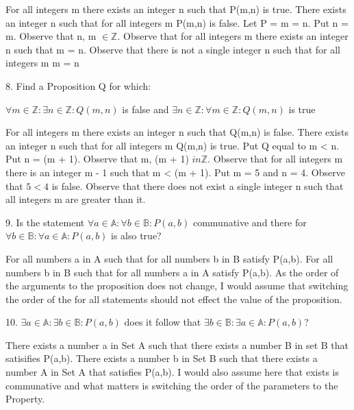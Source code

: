 \documentclass{article}
\begin{document}
  \begin{flushleft}
    For all integers m there exists an integer n such that P(m,n) is true. There exists an integer n such that for all integers m P(m,n) is false. Let P = m = n. Put n = m. Observe that n, m $\in \mathbb{Z}$. Observe that for all integers m there exists an integer n such that m = n. Observe that there is not a single integer n such that for all integers m m = n
  \end{flushleft}
  8. Find a Proposition Q for which:
  \begin{center}
  $\forall m \in \mathbb{Z}: \exists n \in \mathbb{Z}: Q(m,n)$ is false
  and
  $\exists n \in \mathbb{Z}: \forall m \in \mathbb{Z}: Q(m,n)$ is true
  \end{center}
  \begin{flushleft}
    For all integers m there exists an integer n such that Q(m,n) is false. There exists an integer n such that for all integers m Q(m,n) is true. Put Q equal to m < n. Put n = (m + 1). Observe that m, (m + 1) $in \mathbb{Z}$. Observe that for all integers m there is an integer m - 1 such that m < (m + 1). Put m = 5 and n = 4. Observe that $5 < 4$ is false. Observe that there does not exist a single integer n such that all integers m are greater than it.
  \end{flushleft}
  9. Is the statement $\forall a \in \mathbb{A}: \forall b \in \mathbb{B}: P(a,b)$ communative and there for $\forall b \in \mathbb{B}: \forall a \in \mathbb{A}: P(a,b)$ is also true? 
  \begin{flushleft}
    For all numbers a in A such that for all numbers b in B satisfy P(a,b). For all numbers b in B such that for all numbers a in A satisfy P(a,b). As the order of the arguments to the proposition does not change, I would assume that switching the order of the for all statements should not effect the value of the proposition.
  \end{flushleft}
  10. $\exists a \in \mathbb{A}: \exists b \in \mathbb{B}: P(a,b)$ does it follow that $\exists b \in \mathbb{B}: \exists a \in \mathbb{A}: P(a,b)$? 
  \begin{flushleft}
  There exists a number a in Set A such that there exists a number B in set B that satisifies P(a,b). There exists a number b in Set B such that there exists a number A in Set A that satisfies P(a,b). I would also assume here that exists is communative and what matters is switching the order of the parameters to the Property.
  \end{flushleft}
\end{document}
